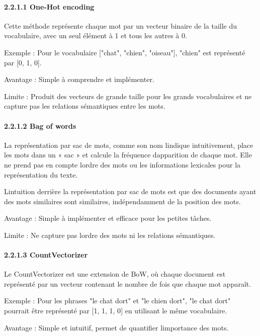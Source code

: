 \documentclass[
]{article}
\begin{document}
\paragraph{2.2.1.1 One-Hot encoding}\label{one-hot-encoding}

Cette méthode représente chaque mot par un vecteur binaire de la taille
du vocabulaire, avec un seul élément à 1 et tous les autres à 0.

Exemple : Pour le vocabulaire {[}"chat", "chien", "oiseau"{]}, "chien"
est représenté par {[}0, 1, 0{]}.

Avantage : Simple à comprendre et implémenter.

Limite : Produit des vecteurs de grande taille pour les grands
vocabulaires et ne capture pas les relations sémantiques entre les mots.

\paragraph{2.2.1.2 Bag of words}\label{bag-of-words}

La représentation par sac de mots, comme son nom
l\textquotesingle indique intuitivement, place les mots dans un « sac »
et calcule la fréquence d\textquotesingle apparition de chaque mot. Elle
ne prend pas en compte l\textquotesingle ordre des mots ou les
informations lexicales pour la représentation du texte.

L\textquotesingle intuition derrière la représentation par sac de mots
est que des documents ayant des mots similaires sont similaires,
indépendamment de la position des mots.

Avantage : Simple à implémenter et efficace pour les petites tâches.

Limite : Ne capture pas l\textquotesingle ordre des mots ni les
relations sémantiques.

\paragraph{2.2.1.3 CountVectorizer}\label{countvectorizer}

Le CountVectorizer est une extension de BoW, où chaque document est
représenté par un vecteur contenant le nombre de fois que chaque mot
apparaît.

Exemple : Pour les phrases "le chat dort" et "le chien dort", "le chat
dort" pourrait être représenté par {[}1, 1, 1, 0{]} en utilisant le même
vocabulaire.

Avantage : Simple et intuitif, permet de quantifier
l\textquotesingle importance des mots.
\end{document}
